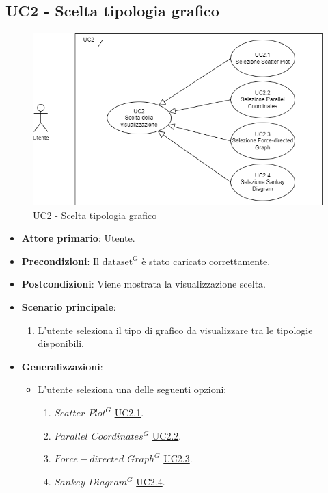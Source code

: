 
\subsection{UC2 - Scelta tipologia grafico}
\label{sec:UC2}
\begin{figure}[h!]
    \centering
    \includegraphics[scale=0.60]{../../assets/Selezione_tipo_grafico.png}
    \caption{UC2 - Scelta tipologia grafico}
\end{figure}
\begin{itemize}
    \item \textbf{Attore primario}: Utente.
    \item \textbf{Precondizioni}: Il ${\mathrm{dataset^{G}}}$ è stato caricato correttamente.
    \item \textbf{Postcondizioni}: Viene mostrata la visualizzazione scelta.
    \item \textbf{Scenario principale}:
          \begin{enumerate}
              \item L'utente seleziona il tipo di grafico da visualizzare tra le tipologie disponibili.
          \end{enumerate}
    \item \textbf{Generalizzazioni}:
    \begin{itemize}
        \item L'utente seleziona una delle seguenti opzioni:
                \begin{enumerate}
                    \item \textit{$Scatter$ $Plot^{G}$} \hyperref[sec:UC2.1]{UC2.1}.
                    \item \textit{$Parallel$ $Coordinates^{G}$} \hyperref[sec:UC2.2]{UC2.2}.
                    \item \textit{$Force-directed$ $Graph^{G}$} \hyperref[sec:UC2.3]{UC2.3}.
                    \item \textit{$Sankey$ $Diagram^{G}$} \hyperref[sec:UC2.4]{UC2.4}.
                \end{enumerate}
    \end{itemize} 
\end{itemize}

